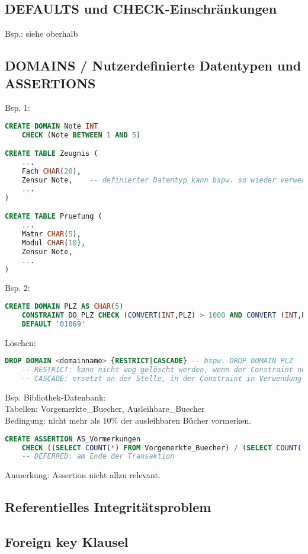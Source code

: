 \subsection{DEFAULTS und CHECK-Einschränkungen}
Bsp.: siehe oberhalb
\subsection{DOMAINS / Nutzerdefinierte Datentypen und ASSERTIONS}
Bsp. 1:
\begin{lstlisting}[language=SQL]
CREATE DOMAIN Note INT 
	CHECK (Note BETWEEN 1 AND 5)

CREATE TABLE Zeugnis (
	...
	Fach CHAR(20),
	Zensur Note,	-- definierter Datentyp kann bspw. so wieder verwendet werden.
	...
)

CREATE TABLE Pruefung (
	...
	Matnr CHAR(5),
	Modul CHAR(10),
	Zensur Note,
	...
)
\end{lstlisting}
Bsp. 2:
\begin{lstlisting}[language=SQL]
CREATE DOMAIN PLZ AS CHAR(5)
	CONSTRAINT DO_PLZ CHECK (CONVERT(INT,PLZ) > 1000 AND CONVERT (INT,PLZ)>10000) 
	DEFAULT '01069'
\end{lstlisting}
Löschen:
\begin{lstlisting}[language=SQL]
DROP DOMAIN <domainname> {RESTRICT|CASCADE} -- bspw. DROP DOMAIN PLZ
	-- RESTRICT: kann nicht weg gelöscht werden, wenn der Constraint noch in einer Tabelle in Verwendung ist
	-- CASCADE: ersetzt an der Stelle, in der Constraint in Verwendung ist, durch Datentyp um Constraint löschen zu können	
\end{lstlisting}
Bsp. Bibliothek-Datenbank:\\
Tabellen: Vorgemerkte\_Buecher, Ausleihbare\_Buecher\\
Bedingung: nicht mehr als $10\%$ der ausleihbaren Bücher vormerken.
\begin{lstlisting}[language=SQL]
CREATE ASSERTION AS_Vormerkungen
	CHECK ((SELECT COUNT(*) FROM Vorgemerkte_Buecher) / (SELECT COUNT(*) FROM Ausleihbare_Buecher) < 0.1) DEFERRED
	-- DEFERRED: am Ende der Transaktion
\end{lstlisting}
Anmerkung: Assertion nicht allzu relevant.

\subsection{Referentielles Integritätsproblem}

\subsection{Foreign key Klausel}

